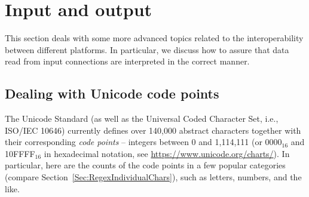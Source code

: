 \documentclass[nojss]{jss}
\begin{document}










\section{Input and output}\label{Sec:io}

This section deals with some more advanced topics related to the
interoperability
between different platforms. In particular, we discuss
how to assure that data read from input connections are interpreted
in the correct manner.



\subsection{Dealing with Unicode code points}\label{Sec:codepoints}

The Unicode Standard (as well as the
Universal Coded Character Set, i.e., ISO/IEC 10646)
currently defines over 140{,}000 abstract characters together with
their corresponding \textit{code points} -- integers
between 0 and 1{,}114{,}111 (or 0000${}_{16}$ and 10FFFF${}_{16}$
in hexadecimal notation, see \url{https://www.unicode.org/charts/}).
In particular, here are the counts of the code points in
a few popular categories (compare Section~\ref{Sec:RegexIndividualChars}),
such as letters, numbers, and the like.
\end{document}
